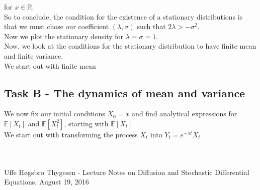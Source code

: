 \documentclass[a4paper,12pt]{article}
\begin{document}
for $x\in \mathbb{R}$.\\

So to conclude, the condition for the existence of a stationary distributions is that we must chose our coefficient $(\lambda, \sigma)$ such that $2\lambda>-\sigma^2$.\\

Now we plot the stationary density for $\lambda=\sigma=1$.\\


Now, we look at the conditions for the stationary distribution to have finite mean and finite variance.\\

We start out with finite mean\\



\subsection{Task B - The dynamics of mean and variance}


We now fix our initial conditions $X_0=x$ and find analytical expressions for $\mathbb{E}[X_t]$ and $\mathbb{E}[X_t^2]$, starting with $\mathbb{E}[X_t]$\\

We start out with transforming the process $X_t$ into $Y_t=e^{-\lambda t}X_t$

\begin{equation*}
\begin{aligned}

\end{aligned}
\end{equation*}



\begin{equation*}
\begin{aligned}

\end{aligned}
\end{equation*}


\newpage
\begin{thebibliography}{99}


 Uffe Høgsbro Thygesen - Lecture Notes on Diffusion and Stochastic Differential Equations, August 19, 2016



\end{thebibliography}
\end{document}
